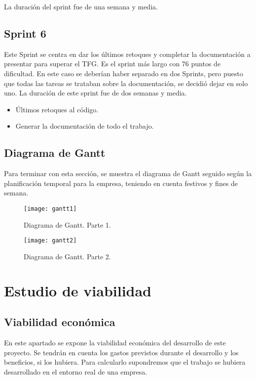 La duración del sprint fue de una semana y media.
\subsection{Sprint 6}
Este Sprint se centra en dar los últimos retoques y completar la documentación a presentar para superar el TFG. Es el sprint más largo con 76 puntos de dificultad. En este caso se deberían haber separado en dos Sprints, pero puesto que todas las tareas se trataban sobre la documentación, se decidió dejar en solo uno. La duración de este sprint fue de dos semanas y media.
\begin{itemize}
\item Últimos retoques al código.
\item Generar la documentación de todo el trabajo.
\end{itemize}


\subsection{Diagrama de Gantt}
Para terminar con esta sección, se muestra el diagrama de Gantt seguido según la planificación temporal para la empresa, teniendo en cuenta festivos y fines de semana.

\begin{figure}[H]%
    \begin{center}%
    \texttt{[image: gantt1]}%
    \caption{Diagrama de Gantt. Parte 1.}%
    \label{Dgantt1}%
    \end{center}%
  \end{figure}%
  
  \begin{figure}[H]%
    \begin{center}%
    \texttt{[image: gantt2]}%
    \caption{Diagrama de Gantt. Parte 2.}%
    \label{Dgantt2}%
    \end{center}%
  \end{figure}%

\section{Estudio de viabilidad}

\subsection{Viabilidad económica}
En este apartado se expone la viabilidad económica del desarrollo de este proyecto. Se tendrán en cuenta los gastos previstos durante el desarrollo y los beneficios, si los hubiera. Para calcularlo supondremos que el trabajo se hubiera desarrollado en el entorno real de una empresa. 

